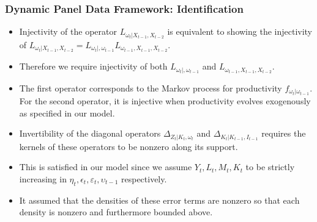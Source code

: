 \documentclass{beamer}
\begin{document}
\begin{frame}
\frametitle{Dynamic Panel Data Framework: Identification}
\begin{itemize}
\item Injectivity of the operator $L_{\omega_{t}|X_{t-1}, X_{t-2}}$ is equivalent to showing the injectivity of $L_{\omega_{t}|X_{t-1}, X_{t-2}}=L_{\omega_{t}|, \omega_{t-1}}L_{\omega_{t-1}, X_{t-1}, X_{t-2}}$.
\item Therefore we require injectivity of both $L_{\omega_{t}|, \omega_{t-1}}$ and $L_{\omega_{t-1}, X_{t-1}, X_{t-2}}$. 
\item The first operator corresponds to the Markov process for productivity $f_{\omega_{t}|\omega_{t-1}}$. For the second operator, it is injective when productivity evolves exogenously as specified in our model.
\item Invertibility of the diagonal operators $\Delta_{Z_{t}|K_{t}, \omega_{t}}$ and $\Delta_{K_{t}|K_{t-1}, I_{t-1}}$ requires the kernels of these operators to be nonzero along its support. 
\item This is satisfied in our model since we assume $Y_{t}, L_{t}, M_{t}, K_{t}$ to be strictly increasing in $\eta_{t}, \epsilon_{t}, \varepsilon_{t}, \upsilon_{t-1}$ respectively. 
\item It assumed that the densities of these error terms are nonzero so that each density is nonzero and furthermore bounded above.
\end{itemize}
\end{frame}

\end{document}

